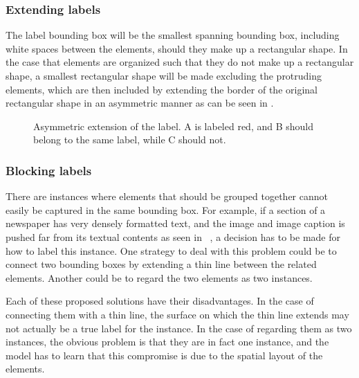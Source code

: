 \documentclass[oneside, english, bibtex]{kththesis}
\begin{document}
\subsubsection{Extending labels}

The label bounding box will be the smallest spanning bounding box, including white spaces between the elements, should they make up a rectangular shape.
In the case that elements are organized such that they do not make up a rectangular shape, a smallest rectangular shape will be made excluding the protruding elements,
which are then included by extending the border of the original rectangular shape in an asymmetric manner as can be seen in .

\begin{figure}[H]
\caption{Asymmetric extension of the label. A is labeled red, and B should belong to the same label, while C should not.}
\label{fig:asymextention}%
\end{figure}

\subsubsection{Blocking labels}

There are instances where elements that should be grouped together cannot easily be captured in the same bounding box.
For example, if a section of a newspaper has very densely formatted text, and the image and image caption is pushed far from its textual contents as seen in ~, a decision has to be made for how to label this instance.
One strategy to deal with this problem could be to connect two bounding boxes by extending a thin line between the related elements. Another could be to regard the two elements as two instances.

Each of these proposed solutions have their disadvantages. In the case of connecting them with a thin line, the surface on which the thin line extends may not actually be a true label for the instance.
In the case of regarding them as two instances, the obvious problem is that they are in fact one instance, and the model has to learn that this compromise is due to the spatial layout of the elements.
\end{document}
